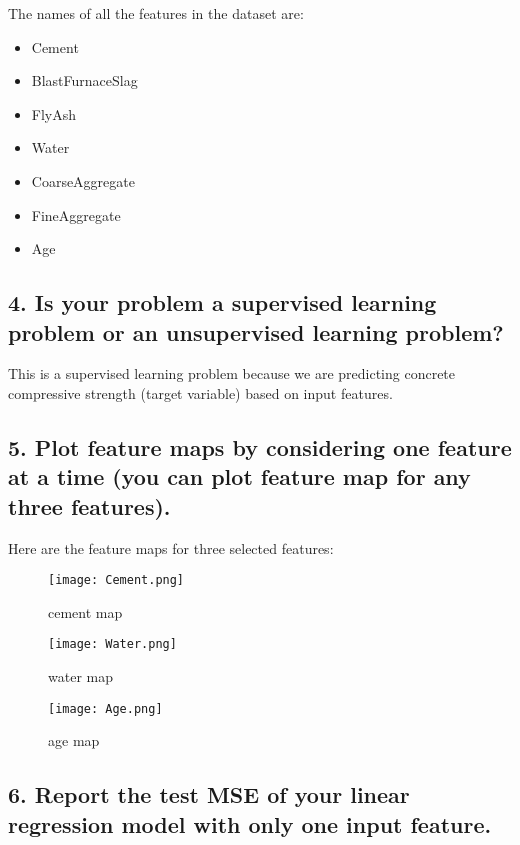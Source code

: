 \documentclass[a4paper,10pt]{article}
\begin{document}
The names of all the features in the dataset are:

\begin{itemize}
    \item Cement
    \item BlastFurnaceSlag
    \item FlyAsh
    \item Water
    \item CoarseAggregate
    \item FineAggregate
    \item Age
\end{itemize}

\subsection*{4. Is your problem a supervised learning problem or an unsupervised learning problem?}

This is a supervised learning problem because we are predicting concrete compressive strength (target variable) based on input features.


\subsection*{5. Plot feature maps by considering one feature at a time (you can plot feature map for any three features).}

Here are the feature maps for three selected features:

\begin{figure}[H]
    \centering
    \texttt{[image: Cement.png]} %
    \caption{cement map}
    \label{fig:cement_map}
\end{figure}
\begin{figure}[H]
    \centering
    \texttt{[image: Water.png]} %
    \caption{water map}
    \label{fig:water_map}
\end{figure}
\begin{figure}[H]
    \centering
    \texttt{[image: Age.png]} %
    \caption{age map}
    \label{fig:age_map}
\end{figure}


\subsection*{6. Report the test MSE of your linear regression model with only one input feature.}
\end{document}
